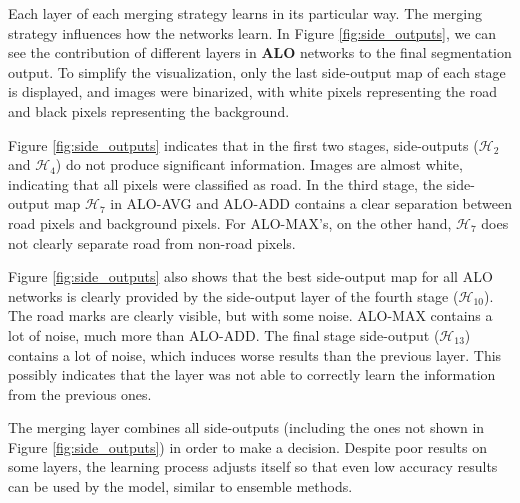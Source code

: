 Each layer of each merging strategy learns in its particular way. The merging strategy influences how the networks learn. In Figure \ref{fig:side_outputs}, we can see the contribution of different layers in \textbf{ALO} networks to the final segmentation output. To simplify the visualization, only the last side-output map of each stage is displayed, and images were binarized, with white pixels representing the road and black pixels representing the background.









Figure \ref{fig:side_outputs} indicates that in the first two stages, side-outputs ($\mathcal{H}_2$ and $\mathcal{H}_4$) do not produce significant information. Images are almost white, indicating that all pixels were classified as road. In the third stage, the side-output map $\mathcal{H}_7$ in ALO-AVG and ALO-ADD contains a clear separation between road pixels and background pixels. For ALO-MAX's, on the other hand, $\mathcal{H}_7$ does not clearly separate road from non-road pixels. 

Figure \ref{fig:side_outputs} also shows that the best side-output map for all ALO networks is clearly provided by the side-output layer of the fourth stage ($\mathcal{H}_{10}$). The road marks are clearly visible, but with some noise. ALO-MAX contains a lot of noise, much more than ALO-ADD. The final stage side-output ($\mathcal{H}_{13}$) contains a lot of noise, which induces worse results than the previous layer. This possibly indicates that the layer was not able to correctly learn the information from the previous ones.

The merging layer combines all side-outputs (including the ones not shown in Figure \ref{fig:side_outputs}) in order to make a decision. Despite poor results on some layers, the learning process adjusts itself so that even low accuracy results can be used by the model, similar to ensemble methods.


